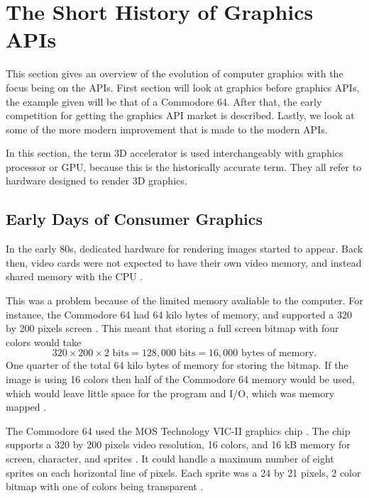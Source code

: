 \section{The Short History of Graphics \acs{API}s}\label{sec:short_history}
\begin{sectionmeta}
	This section gives an overview of the evolution of computer graphics with the focus being on the \glspl{API}.
	First section will look at graphics before graphics \glspl{API}, the example given will be that of a Commodore 64.
	After that, the early competition for getting the graphics \gls{API} market is described.
	Lastly, we look at some of the more modern improvement that is made to the modern \glspl{API}.
	
	In this section, the term 3D accelerator is used interchangeably with graphics processor or \gls{GPU}, because this is the historically accurate term. 
	They all refer to hardware designed to render 3D graphics.
\end{sectionmeta}

\subsection{Early Days of Consumer Graphics}

In the early 80s, dedicated hardware for rendering images started to appear.
Back then, video cards were not expected to have their own video memory, and instead shared memory with the \gls{CPU} \cite{wikipedia????shared}.

This was a problem because of the limited memory avaliable to the computer.
For instance, the Commodore 64 had 64 kilo bytes of memory, and supported a 320 by 200 pixels screen \cite{commodore1983commodore}.
This meant that storing a full screen bitmap with four colors would take $$320\times 200\times 2 \text{ bits} = 128,000 \text{ bits} = 16,000 \text{ bytes of memory.}$$
One quarter of the total 64 kilo bytes of memory for storing the bitmap.
If the image is using 16 colors then half of the Commodore 64 memory would be used, which would leave little space for the program and I/O, which was memory mapped \cite{commodore1983commodore}.

The Commodore 64 used the MOS Technology VIC-II graphics chip \cite{commodore1983commodore}.
The chip supports a 320 by 200 pixels video resolution, 16 colors, and 16 kB memory for screen, character, and sprites \cite{commodore1983commodore}.
It could handle a maximum number of eight sprites on each horizontal line of pixels.
Each sprite was a 24 by 21 pixels, 2 color bitmap with one of colors being transparent \cite{commodore1983commodore}.

